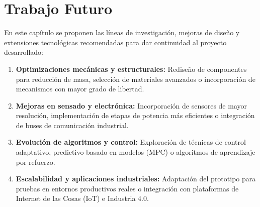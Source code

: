 
\chapter{Trabajo Futuro}
\label{cap:trabajo-futuro}

En este capítulo se proponen las líneas de investigación, mejoras de diseño y extensiones tecnológicas recomendadas para dar continuidad al proyecto desarrollado:

\begin{enumerate}
    \item \textbf{Optimizaciones mecánicas y estructurales:} Rediseño de componentes para reducción de masa, selección de materiales avanzados o incorporación de mecanismos con mayor grado de libertad.
    \item \textbf{Mejoras en sensado y electrónica:} Incorporación de sensores de mayor resolución, implementación de etapas de potencia más eficientes o integración de buses de comunicación industrial.
    \item \textbf{Evolución de algoritmos y control:} Exploración de técnicas de control adaptativo, predictivo basado en modelos (MPC) o algoritmos de aprendizaje por refuerzo.
    \item \textbf{Escalabilidad y aplicaciones industriales:} Adaptación del prototipo para pruebas en entornos productivos reales o integración con plataformas de Internet de las Cosas (IoT) e Industria 4.0.
\end{enumerate}
